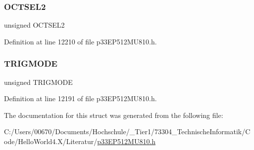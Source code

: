 \subsubsection{\texorpdfstring{O\+C\+T\+S\+E\+L2}{OCTSEL2}}
{\footnotesize\ttfamily unsigned O\+C\+T\+S\+E\+L2}



Definition at line 12210 of file p33\+E\+P512\+M\+U810.\+h.

\mbox{\label{structtag_o_c16_c_o_n1_b_i_t_s_a7a0057e0dca6e2663584b5b9e1da04c3}} 
\subsubsection{\texorpdfstring{T\+R\+I\+G\+M\+O\+DE}{TRIGMODE}}
{\footnotesize\ttfamily unsigned T\+R\+I\+G\+M\+O\+DE}



Definition at line 12191 of file p33\+E\+P512\+M\+U810.\+h.



The documentation for this struct was generated from the following file\+:\begin{DoxyCompactItemize}
\item 
C\+:/\+Users/00670/\+Documents/\+Hochschule/\+\_\+\+Tier1/73304\+\_\+\+Technische\+Informatik/\+Code/\+Hello\+World4.\+X/\+Literatur/\hyperlink{p33_e_p512_m_u810_8h}{p33\+E\+P512\+M\+U810.\+h}\end{DoxyCompactItemize}
